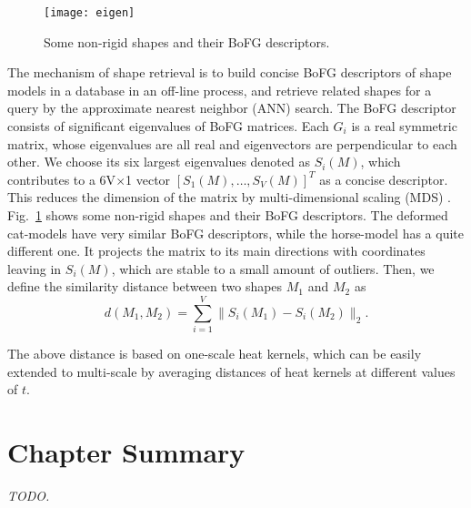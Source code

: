 \begin{figure}
\centering
\texttt{[image: eigen]}
\caption[Nonrigid shapes and their BoFG descriptors.]
{Some non-rigid shapes and their BoFG descriptors.}
\label{fig:eigen}
\end{figure}

The mechanism of shape retrieval is to build concise BoFG descriptors of shape models in a database in an off-line process, and retrieve related shapes for a query by the approximate nearest neighbor (ANN) search. The BoFG descriptor consists of significant eigenvalues of BoFG matrices. Each $G_i$ is a real symmetric matrix, whose eigenvalues are all real and eigenvectors are perpendicular to each other. We choose its six largest eigenvalues denoted as $S_i(M)$, which contributes to a 6V$\times$1 vector $[S_1(M),\dots,S_V(M)]^T$ as a concise descriptor. This reduces the dimension of the matrix by multi-dimensional scaling (MDS) \cite{Bronstein2006}. Fig.~\ref{fig:eigen} shows some non-rigid shapes and their BoFG descriptors. The deformed cat-models have very similar BoFG descriptors, while the horse-model has a quite different one. It projects the matrix to its main directions with coordinates leaving in $S_i(M)$, which are stable to a small amount of outliers. Then, we define the similarity distance between two shapes $M_1$ and $M_2$ as
\begin{equation}
d(M_1,M_2)=\sum_{i=1}^{V}\|S_i(M_1)-S_i(M_2) \|_2.
\end{equation}

The above distance is based on one-scale heat kernels, which can be easily extended to multi-scale by averaging distances of heat kernels at different values of $t$.

\section{Chapter Summary}
\emph{TODO.} 